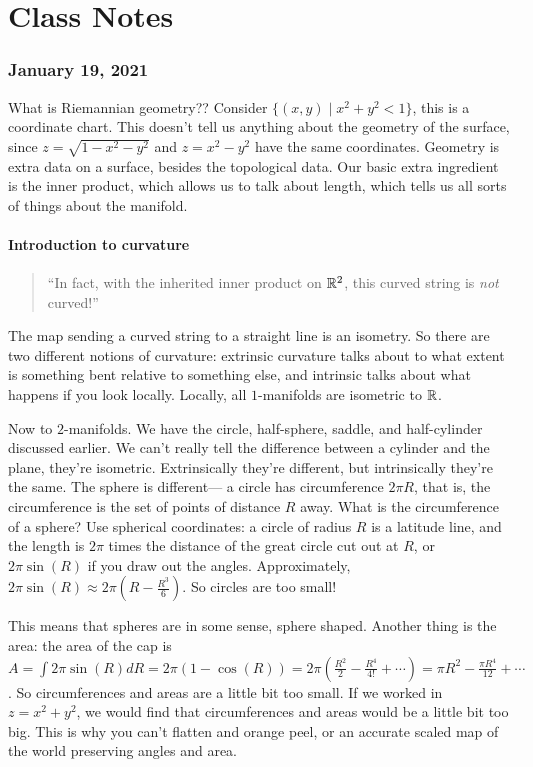 \part{Class Notes}
\section{January 19, 2021}
What is Riemannian geometry?? Consider $\{(x,y) \mid x^2+y^2<1\} $, this is a coordinate chart. This doesn't tell us anything about the geometry of the surface, since $z= \sqrt{1-x^2-y^2} $ and $z=x^2-y^2$ have the same coordinates. Geometry is extra data on a surface, besides the topological data. Our basic extra ingredient is the inner product, which allows us to talk about length, which tells us all sorts of things about the manifold.
\subsection{Introduction to curvature}
\begin{quote}
    ``In fact, with the inherited inner product on $\mathbb{R}^2$, this curved string is \emph{not} curved!''
\end{quote}
The map sending a curved string to a straight line is an isometry. So there are two different notions of curvature: extrinsic curvature talks about to what extent is something bent relative to something else, and intrinsic talks about what happens if you look locally. Locally, all $1$-manifolds are isometric to $\mathbb{R}$.

Now to $2$-manifolds. We have the circle, half-sphere, saddle, and half-cylinder discussed earlier. We can't really tell the difference between a cylinder and the plane, they're isometric. Extrinsically they're different, but intrinsically they're the same. The sphere is different--- a circle has circumference $2\pi R$, that is, the circumference is the set of points of distance $R$ away. What is the circumference of a sphere? Use spherical coordinates: a circle of radius $R$ is a latitude line, and the length is $2\pi$ times the distance of the great circle cut out at $R$, or $2\pi \sin(R)$ if you draw out the angles. Approximately, $2\pi \sin(R) \approx 2\pi (R- \frac{R^3}{6})$. So circles are too small!

This means that spheres are in some sense, sphere shaped. Another thing is the area: the area of the cap is $A= \int 2\pi \sin(R)dR=2\pi (1-\cos (R))=2\pi (\frac{R^2}{2}-\frac{R^4}{4!}+\cdots )=\pi R^2- \frac{\pi R^4}{12}+\cdots $. So circumferences and areas are a little bit too small. If we worked  in $z=x^2+y^2$, we would find that circumferences and areas would be a little bit too big. This is why you can't flatten and orange peel, or an accurate scaled map of the world preserving angles and area.
